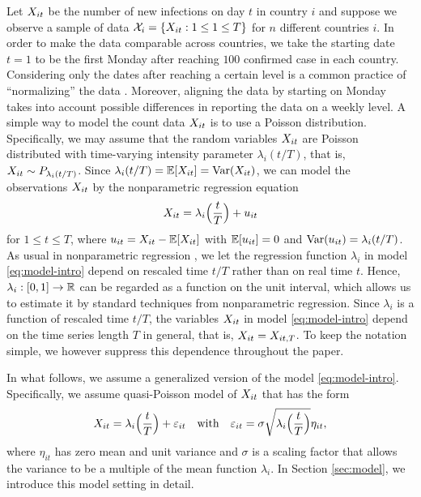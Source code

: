 \documentclass[a4paper,12pt]{article}
\numberwithin{equation}{section}
\begin{document}
Let $X_{it}$ be the number of new infections on day $t$ in country $i$ and suppose we observe a sample of data $\mathcal{X}_i = \{ X_{it}: 1 \le 1 \le T \}$ for $n$ different countries $i$. In order to make the data comparable across countries, we take the starting date $t=1$ to be the first Monday after reaching $100$ confirmed case in each country. Considering only the dates after reaching a certain level is a common practice of ``normalizing'' the data \citep[cp.\ e.g.][]{Cohen2020}. Moreover, aligning the data by starting on Monday takes into account possible differences in reporting the data on a weekly level. A simple way to model the count data $X_{it}$ is to use a Poisson distribution. Specifically, we may assume that the random variables $X_{it}$ are Poisson distributed with time-varying intensity parameter $\lambda_i(t/T)$, that is, $X_{it} \sim P_{\lambda_i(t/T)}$. Since $\lambda_i(t/T) = \mathbb{E}[X_{it}] = \textnormal{Var}(X_{it})$, we can model the observations $X_{it}$ by the nonparametric regression equation 
\begin{equation}\label{eq:model-intro}
X_{it} = \lambda_i\Big(\frac{t}{T}\Big) + u_{it} 
\end{equation}
for $1 \le t \le T$, where $u_{it} = X_{it} - \mathbb{E}[X_{it}]$ with $\mathbb{E}[u_{it}] = 0$ and $\textnormal{Var}(u_{it}) = \lambda_i(t/T)$. As usual in nonparametric regression \citep[cp.][]{Robinson1989}, we let the regression function $\lambda_i$ in model \eqref{eq:model-intro} depend on rescaled time $t/T$ rather than on real time $t$. Hence, $\lambda_i: [0,1] \rightarrow \mathbb{R}$ can be regarded as a function on the unit interval, which allows us to estimate it by standard techniques from nonparametric regression. Since $\lambda_i$ is a function of rescaled time $t/T$, the variables $X_{it}$ in model \eqref{eq:model-intro} depend on the time series length $T$ in general, that is, $X_{it} = X_{it,T}$. To keep the notation simple, we however suppress this dependence throughout the paper.

In what follows, we assume a generalized version of the model \eqref{eq:model-intro}. Specifically, we assume quasi-Poisson model of $X_{it}$ that has the form 
\begin{equation}\label{eq:model-intro2}
X_{it} = \lambda_i\Big(\frac{t}{T}\Big) + \varepsilon_{it} \quad \text{with} \quad \varepsilon_{it} = \sigma \sqrt{\lambda_i\Big(\frac{t}{T}\Big)} \eta_{it}, 
\end{equation}
where $\eta_{it}$ has zero mean and unit variance and $\sigma$ is a scaling factor that allows the variance to be a multiple of the mean function $\lambda_i$. In Section \ref{sec:model}, we introduce this model setting in detail.
\end{document}
